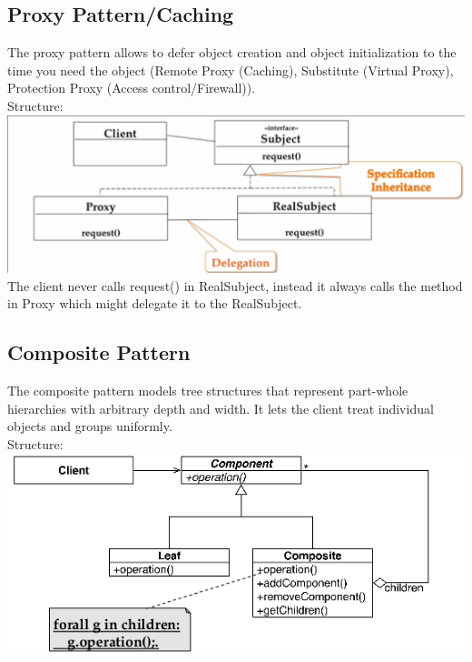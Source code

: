 \subsection{Proxy Pattern/Caching}
The proxy pattern allows to defer object creation and object initialization to the time you need the object (Remote Proxy (Caching), Substitute (Virtual Proxy), Protection Proxy (Access control/Firewall)).\\
Structure: \\
\includegraphics[width=\linewidth]{design_pattern/proxy.png}
The client never calls request() in RealSubject, instead it always calls the method in Proxy which might delegate it to the RealSubject.

\subsection{Composite Pattern}
The composite pattern models tree structures that represent part-whole hierarchies with arbitrary depth and width.
It lets the client treat individual objects and groups uniformly. \\
Structure: \\
\includegraphics[width=\linewidth]{design_pattern/composite.png}
